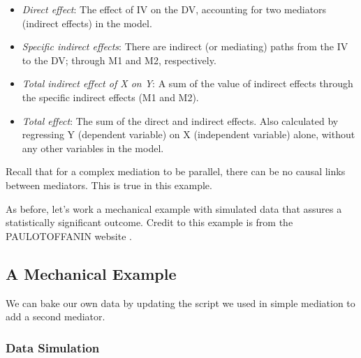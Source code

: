 \documentclass[
  11pt,
]{book}
\providecommand{\tightlist}{%
  \setlength{\itemsep}{0pt}\setlength{\parskip}{0pt}}
\begin{document}
\begin{itemize}
\tightlist
\item
  \emph{Direct effect}: The effect of IV on the DV, accounting for two mediators (indirect effects) in the model.
\item
  \emph{Specific indirect effects}: There are indirect (or mediating) paths from the IV to the DV; through M1 and M2, respectively.
\item
  \emph{Total indirect effect of X on Y}: A sum of the value of indirect effects through the specific indirect effects (M1 and M2).
\item
  \emph{Total effect}: The sum of the direct and indirect effects. Also calculated by regressing Y (dependent variable) on X (independent variable) alone, without any other variables in the model.
\end{itemize}

Recall that for a complex mediation to be parallel, there can be no causal links between mediators. This is true in this example.

As before, let's work a mechanical example with simulated data that assures a statistically significant outcome. Credit to this example is from the PAULOTOFFANIN website \citep{toffanin_multiple-mediator_2017}.

\hypertarget{a-mechanical-example}{%
\subsection{A Mechanical Example}\label{a-mechanical-example}}

We can bake our own data by updating the script we used in simple mediation to add a second mediator.

\hypertarget{data-simulation}{%
\subsubsection{Data Simulation}\label{data-simulation}}
\end{document}
